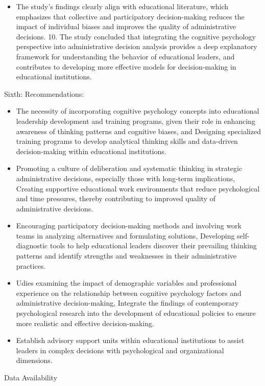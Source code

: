 \documentclass[10pt]{NSP1}
\begin{document}
\begin{itemize}
  \item The study's findings clearly align with educational literature, which emphasizes that collective and participatory decision-making reduces the impact of individual biases and improves the quality of administrative decisions. 10. The study concluded that integrating the cognitive psychology perspective into administrative decision analysis provides a deep explanatory framework for understanding the behavior of educational leaders, and contributes to developing more effective models for decision-making in educational institutions.
\end{itemize}

Sixth: Recommendations:

\begin{itemize}
  \item The necessity of incorporating cognitive psychology concepts into educational leadership development and training programs, given their role in enhancing awareness of thinking patterns and cognitive biases, and Designing specialized training programs to develop analytical thinking skills and data-driven decision-making within educational institutions.
  \item Promoting a culture of deliberation and systematic thinking in strategic administrative decisions, especially those with long-term implications, Creating supportive educational work environments that reduce psychological and time pressures, thereby contributing to improved quality of administrative decisions.
  \item Encouraging participatory decision-making methods and involving work teams in analyzing alternatives and formulating solutions, Developing self-diagnostic tools to help educational leaders discover their prevailing thinking patterns and identify strengths and weaknesses in their administrative practices.
  \item Udies examining the impact of demographic variables and professional experience on the relationship between cognitive psychology factors and administrative decision-making, Integrate the findings of contemporary psychological research into the development of educational policies to ensure more realistic and effective decision-making.
  \item Establish advisory support units within educational institutions to assist leaders in complex decisions with psychological and organizational dimensions.
\end{itemize}

Data Availability
\end{document}
